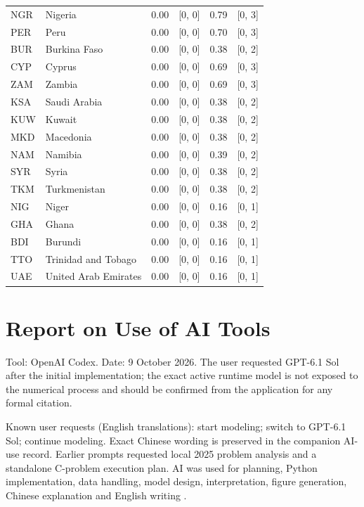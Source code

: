 \documentclass[11pt,a4paper]{article}
\begin{document}
{\begin{longtable}{@{}L{1.098cm} L{4.464cm} R{1.463cm} R{2.195cm} R{1.610cm} R{2.342cm}@{}}
NGR & Nigeria & 0.00 & [0, 0] & 0.79 & [0, 3]\\
PER & Peru & 0.00 & [0, 0] & 0.70 & [0, 3]\\
BUR & Burkina Faso & 0.00 & [0, 0] & 0.38 & [0, 2]\\
CYP & Cyprus & 0.00 & [0, 0] & 0.69 & [0, 3]\\
ZAM & Zambia & 0.00 & [0, 0] & 0.69 & [0, 3]\\
KSA & Saudi Arabia & 0.00 & [0, 0] & 0.38 & [0, 2]\\
KUW & Kuwait & 0.00 & [0, 0] & 0.38 & [0, 2]\\
MKD & Macedonia & 0.00 & [0, 0] & 0.38 & [0, 2]\\
NAM & Namibia & 0.00 & [0, 0] & 0.39 & [0, 2]\\
SYR & Syria & 0.00 & [0, 0] & 0.38 & [0, 2]\\
TKM & Turkmenistan & 0.00 & [0, 0] & 0.38 & [0, 2]\\
NIG & Niger & 0.00 & [0, 0] & 0.16 & [0, 1]\\
GHA & Ghana & 0.00 & [0, 0] & 0.38 & [0, 2]\\
BDI & Burundi & 0.00 & [0, 0] & 0.16 & [0, 1]\\
TTO & Trinidad and Tobago & 0.00 & [0, 0] & 0.16 & [0, 1]\\
UAE & United Arab Emirates & 0.00 & [0, 0] & 0.16 & [0, 1]\\
\bottomrule
\end{longtable}}
\par{}
\clearpage
\section*{Report on Use of AI Tools}
Tool: OpenAI Codex. Date: 9 October 2026. The user requested GPT-6.1 Sol after the initial implementation; the exact active runtime model is not exposed to the numerical process and should be confirmed from the application for any formal citation.

Known user requests (English translations): start modeling; switch to GPT-6.1 Sol; continue modeling. Exact Chinese wording is preserved in the companion AI-use record. Earlier prompts requested local 2025 problem analysis and a standalone C-problem execution plan. AI was used for planning, Python implementation, data handling, model design, interpretation, figure generation, Chinese explanation and English writing \cite{codex-use}.
\end{document}
